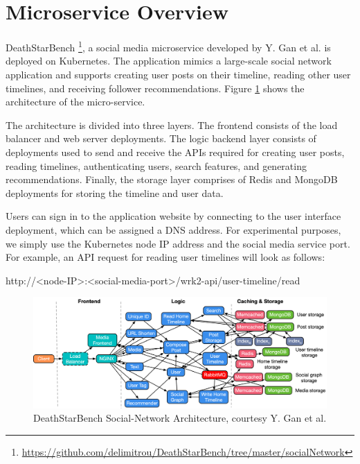 \section{Microservice Overview}
\label{sec:ch4-microservice-overview}

DeathStarBench \footnote{\url{https://github.com/delimitrou/DeathStarBench/tree/master/socialNetwork}}, a social media microservice developed by Y. Gan et al. \cite{gan2019open} is deployed on Kubernetes. The application mimics a large-scale social network application and supports creating user posts on their timeline, reading other user timelines, and receiving follower recommendations. Figure \ref{fig:social} shows the architecture of the micro-service.\par

The architecture is divided into three layers. The frontend consists of the load balancer and web server deployments. The logic backend layer consists of deployments used to send and receive the APIs required for creating user posts, reading timelines, authenticating users, search features, and generating recommendations. Finally, the storage layer comprises of Redis and MongoDB deployments for storing the timeline and user data.\par

Users can sign in to the application website by connecting to the user interface deployment, which can be assigned a DNS address. For experimental purposes, we simply use the Kubernetes node IP address and the social media service port. For example, an API request for reading user timelines will look as follows:\par

http://<node-IP>:<social-media-port>/wrk2-api/user-timeline/read

\begin{figure}[htb]
    \centering
    \caption{DeathStarBench Social-Network Architecture, courtesy Y. Gan et al. \cite{gan2019open}}
    \label{fig:social}
    \includegraphics[width=1.0\linewidth]{Figures/Social-Network-Architecture.pdf}
\end{figure}

